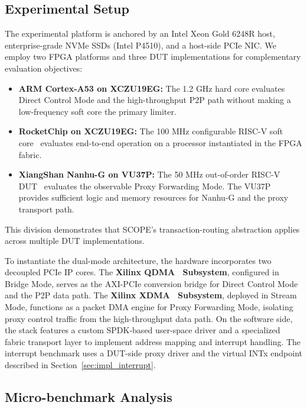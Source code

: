 \documentclass[10pt,conference,letterpaper]{IEEEtran}
\begin{document}
\subsection{Experimental Setup}
The experimental platform is anchored by an Intel Xeon Gold 6248R host, enterprise-grade NVMe SSDs (Intel P4510), and a host-side PCIe NIC. We employ two FPGA platforms and three DUT implementations for complementary evaluation objectives:

\begin{itemize}
    \item \textbf{ARM Cortex-A53 on XCZU19EG:} The 1.2 GHz hard core evaluates Direct Control Mode and the high-throughput P2P path without making a low-frequency soft core the primary limiter.
    \item \textbf{RocketChip on XCZU19EG:} The 100 MHz configurable RISC-V soft core~\cite{asanovic2016rocket} evaluates end-to-end operation on a processor instantiated in the FPGA fabric.
    \item \textbf{XiangShan Nanhu-G on VU37P:} The 50 MHz out-of-order RISC-V DUT~\cite{micro2022xiangshan} evaluates the observable Proxy Forwarding Mode. The VU37P provides sufficient logic and memory resources for Nanhu-G and the proxy transport path.
\end{itemize}

This division demonstrates that SCOPE's transaction-routing abstraction applies across multiple DUT implementations.

To instantiate the dual-mode architecture, the hardware incorporates two decoupled PCIe IP cores. The \textbf{Xilinx QDMA~\cite{amd_xilinx_qdma} Subsystem}, configured in Bridge Mode, serves as the AXI-PCIe conversion bridge for Direct Control Mode and the P2P data path. The \textbf{Xilinx XDMA~\cite{amd_xilinx_pcie_dma} Subsystem}, deployed in Stream Mode, functions as a packet DMA engine for Proxy Forwarding Mode, isolating proxy control traffic from the high-throughput data path. On the software side, the stack features a custom SPDK-based user-space driver and a specialized fabric transport layer to implement address mapping and interrupt handling. The interrupt benchmark uses a DUT-side proxy driver and the virtual INTx endpoint described in Section~\ref{sec:impl_interrupt}.

\subsection{Micro-benchmark Analysis}
\end{document}

